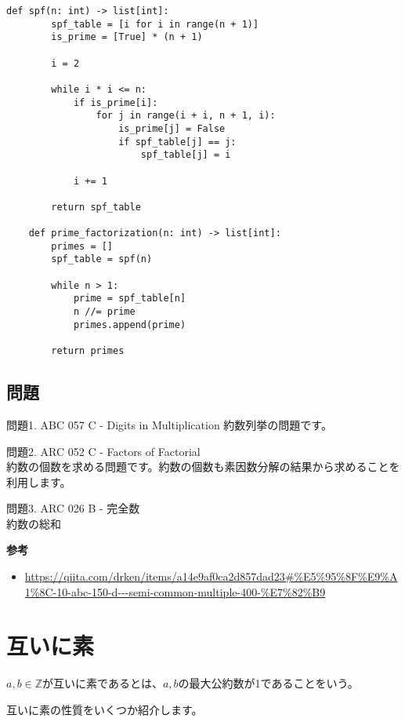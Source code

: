 \begin{lstlisting}[caption=SPFを用いた素因数分解の実装, label=spf, frame=TRBL]
def spf(n: int) -> list[int]:
        spf_table = [i for i in range(n + 1)]
        is_prime = [True] * (n + 1)
        
        i = 2
        
        while i * i <= n:
            if is_prime[i]:
                for j in range(i + i, n + 1, i):
                    is_prime[j] = False
                    if spf_table[j] == j:
                        spf_table[j] = i
            
            i += 1
            
        return spf_table 
    
    def prime_factorization(n: int) -> list[int]:
        primes = []
        spf_table = spf(n)
        
        while n > 1:
            prime = spf_table[n]
            n //= prime
            primes.append(prime)
        
        return primes
\end{lstlisting}

\subsection{問題}
問題1. ABC 057 C - Digits in Multiplication
約数列挙の問題です。

問題2. ARC 052 C - Factors of Factorial \\
約数の個数を求める問題です。約数の個数も素因数分解の結果から求めることを利用します。

問題3. ARC 026 B - 完全数\\
約数の総和

\textbf{参考}
\begin{itemize}
    \item \url{https://qiita.com/drken/items/a14e9af0ca2d857dad23#%E5%95%8F%E9%A1%8C-10-abc-150-d---semi-common-multiple-400-%E7%82%B9}
\end{itemize}
\section{互いに素}

\begin{definitionbox}[互いに素]
    $a, b \in \mathbb{Z}$が互いに素であるとは、$a, b$の最大公約数が1であることをいう。
\end{definitionbox}

互いに素の性質をいくつか紹介します。

